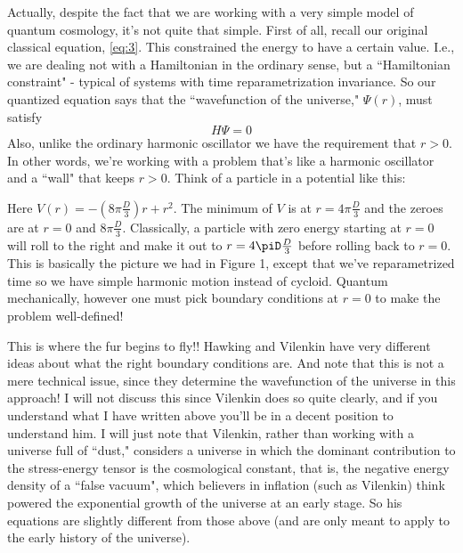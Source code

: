 Actually, despite the fact that we are working with a very simple model of quantum cosmology, it's not quite that simple. First of all, recall our original classical equation, \eqref{eq:3}. This constrained the energy to have a certain value. I.e., we are dealing not with a Hamiltonian in the ordinary sense, but a ``Hamiltonian constraint" - typical of systems with time reparametrization invariance. So our quantized equation says that the ``wavefunction of the universe," $\Psi(r)$, must satisfy
\[H\Psi = 0\]
Also, unlike the ordinary harmonic oscillator we have the requirement that $r > 0$. In other words, we're working with a problem that's like a harmonic oscillator and a ``wall" that keeps $r > 0$. Think of a particle in a potential like this:
\begin{center}
\end{center}

Here $V(r) = - (8\pi \frac{D}{3})r + r^2$. The minimum of $V$ is at $r = 4\pi \frac{D}{3}$ and the zeroes are at $r = 0$ and $8\pi \frac{D}{3}$. Classically, a particle with zero energy starting at $r = 0$ will roll to the right and make it out to $r = 4\piD\frac{D}{3}$ before rolling back to $r = 0$. This is basically the picture we had in Figure 1, except that we've reparametrized time so we have simple harmonic motion instead of cycloid.
Quantum mechanically, however one must pick boundary conditions at $r = 0$ to make the problem well-defined!

This is where the fur begins to fly!! Hawking and Vilenkin have very different ideas about what the right boundary conditions are. And note that this is not a mere technical issue, since they determine the wavefunction of the universe in this approach! I will not discuss this since Vilenkin does so quite clearly, and if you understand what I have written above you'll be in a decent position to understand him. I will just note that Vilenkin, rather than working with a universe full of ``dust," considers a universe in which the dominant contribution to the stress-energy tensor is the cosmological constant, that is, the negative energy density of a ``false vacuum", which believers in inflation (such as Vilenkin) think powered the exponential growth of the universe at an early stage. So his equations are slightly different from those above (and are only meant to apply to the early history of the universe).

